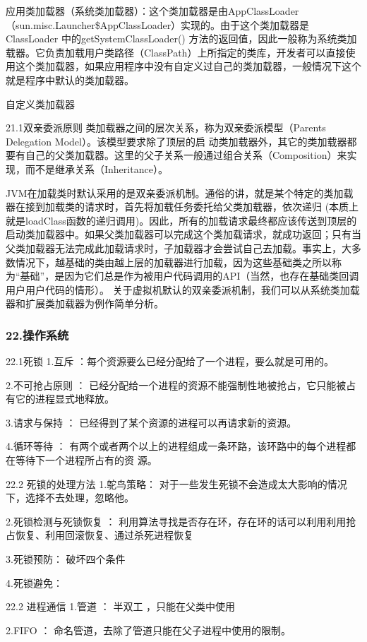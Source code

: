 \documentclass[UTF8]{ctexart}
\begin{document}
应用类加载器（系统类加载器）：这个类加载器是由AppClassLoader（sun.misc.Launcher\$AppClassLoader）实现的。由于这个类加载器是 ClassLoader 中的getSystemClassLoader() 方法的返回值，因此一般称为系统类加载器。它负责加载用户类路径（ClassPath）上所指定的类库，开发者可以直接使用这个类加载器，如果应用程序中没有自定义过自己的类加载器，一般情况下这个就是程序中默认的类加载器。

自定义类加载器

21.1双亲委派原则
类加载器之间的层次关系，称为双亲委派模型（Parents Delegation Model）。该模型要求除了顶层的启
动类加载器外，其它的类加载器都要有自己的父类加载器。这里的父子关系一般通过组合关系（Composition）来实现，而不是继承关系（Inheritance）。

JVM在加载类时默认采用的是双亲委派机制。通俗的讲，就是某个特定的类加载器在接到加载类的请求时，首先将加载任务委托给父类加载器，依次递归 (本质上就是loadClass函数的递归调用)。因此，所有的加载请求最终都应该传送到顶层的启动类加载器中。如果父类加载器可以完成这个类加载请求，就成功返回；只有当父类加载器无法完成此加载请求时，子加载器才会尝试自己去加载。事实上，大多数情况下，越基础的类由越上层的加载器进行加载，因为这些基础类之所以称为“基础”，是因为它们总是作为被用户代码调用的API（当然，也存在基础类回调用户用户代码的情形）。 关于虚拟机默认的双亲委派机制，我们可以从系统类加载器和扩展类加载器为例作简单分析。
\subsubsection{22.操作系统}
22.1死锁
1.互斥 ：每个资源要么已经分配给了一个进程，要么就是可用的。

2.不可抢占原则 ： 已经分配给一个进程的资源不能强制性地被抢占，它只能被占有它的进程显式地释放。

3.请求与保持 ： 已经得到了某个资源的进程可以再请求新的资源。

4.循环等待 ： 有两个或者两个以上的进程组成一条环路，该环路中的每个进程都在等待下一个进程所占有的资
源。

22.2 死锁的处理方法
1.鸵鸟策略： 对于一些发生死锁不会造成太大影响的情况下，选择不去处理，忽略他。

2.死锁检测与死锁恢复 ： 利用算法寻找是否存在环，存在环的话可以利用利用抢占恢复、利用回滚恢复、通过杀死进程恢复

3.死锁预防： 破坏四个条件

4.死锁避免：

22.2 进程通信
1.管道 ： 半双工 ，只能在父类中使用

2.FIFO ： 命名管道，去除了管道只能在父子进程中使用的限制。
\end{document}
